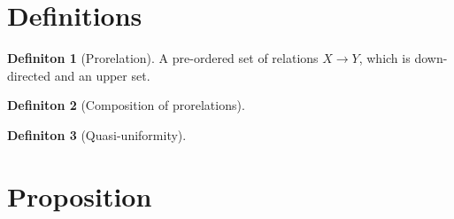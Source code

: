 \documentclass[18pt,a4paper]{article}
\theoremstyle{theorem}
\theoremstyle{definition}
\newtheorem{definition}{Definiton}[section]
\theoremstyle{lemma}
\begin{document}
\section{Definitions}%
\label{sec:definitions}
\begin{definition}[Prorelation] %
A pre-ordered set of relations $X \to Y$, which is down-directed and an upper set.
\end{definition}
\begin{definition}[Composition of prorelations] %

\end{definition}
\begin{definition}[Quasi-uniformity] %

\end{definition}



\section{Proposition}
\end{document}
